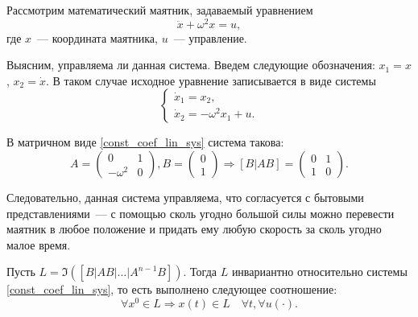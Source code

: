 \begin{ex}
	Рассмотрим математический маятник, задаваемый уравнением
	\begin{equation*}
	  \ddot{x} + \omega^2 x = u,
	\end{equation*}
	где $x$~--- координата маятника, $u$~--- управление.
	
	Выясним, управляема ли данная система. Введем следующие обозначения:
	$x_1 = x$, $x_2 = \dot{x}$. В таком случае исходное уравнение записывается в виде системы
	\begin{equation}
	\label{pendulum_system}
	  \begin{cases}
	    \dot{x}_1 = x_2,\\
			\dot{x}_2 = -\omega^2 x_1 + u.
	  \end{cases}
	\end{equation}
	
	В матричном виде \eqref{const_coef_lin_sys} система такова:
	\begin{equation*}
	  A =
	  \begin{pmatrix}
	    0 & 1\\
	    -\omega^2 & 0
	  \end{pmatrix}, 
		B =
	  \begin{pmatrix}
	    0\\
	    1
	  \end{pmatrix}
	  \Rightarrow
	  \left[ B | A B \right] =
	  \begin{pmatrix}
	    0 & 1\\
	    1 & 0
	  \end{pmatrix}.
	\end{equation*}
	
	Следовательно, данная система управляема, что согласуется с бытовыми представлениями~--- с помощью
	сколь угодно большой силы можно перевести маятник в любое положение и придать ему любую скорость
	за сколь угодно малое время.
\end{ex}

\begin{lemma}
  Пусть $L = \Im\left([B | A B | \ldots | A^{n - 1} B]\right)$. Тогда $L$ инвариантно относительно
  системы \eqref{const_coef_lin_sys}, то есть выполнено следующее соотношение:
  \begin{equation*}
    \forall x^0 \in L \Rightarrow x(t) \in L \quad \forall t, \forall u(\cdot).
  \end{equation*}
\end{lemma}


